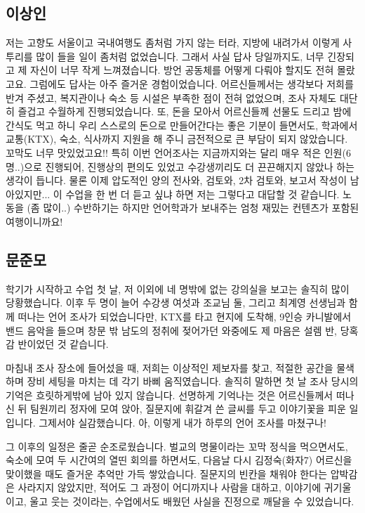 \subsection{이상인}
저는 고향도 서울이고 국내여행도 좀처럼 가지 않는 터라, 지방에 내려가서 이렇게 사투리를 많이 들을 일이 좀처럼 없었습니다. 그래서 사실 답사 당일까지도, 너무 긴장되고 제 자신이 너무 작게 느껴졌습니다. 방언 공동체를 어떻게 다뤄야 할지도 전혀 몰랐고요. 그럼에도 답사는 아주 즐거운 경험이었습니다. 어르신들께서는 생각보다 저희를 반겨 주셨고, 복지관이나 숙소 등 시설은 부족한 점이 전혀 없었으며, 조사 자체도 대단히 즐겁고 수월하게 진행되었습니다. 또, 돈을 모아서 어르신들께 선물도 드리고 밤에 간식도 먹고 하니 우리 스스로의 돈으로 만들어간다는 좋은 기분이 들면서도, 학과에서 교통(KTX), 숙소, 식사까지 지원을 해 주니 금전적으로 큰 부담이 되지 않았습니다. 꼬막도 너무 맛있었고요!! 특히 이번 언어조사는 지금까지와는 달리 매우 적은 인원(6명..)으로 진행되어, 진행상의 편의도 있었고 수강생끼리도 더 끈끈해지지 않았나 하는 생각이 듭니다. 물론 이제 압도적인 양의 전사와, 검토와, 2차 검토와, 보고서 작성이 남아있지만... 이 수업을 한 번 더 듣고 싶냐 하면 저는 그렇다고 대답할 것 같습니다. 노동을 (좀 많이..) 수반하기는 하지만 언어학과가 보내주는 엄청 재밌는 컨텐츠가 포함된 여행이니까요!

\subsection{문준모}
학기가 시작하고 수업 첫 날, 저 이외에 네 명밖에 없는 강의실을 보고는 솔직히 많이 당황했습니다. 이후 두 명이 늘어 수강생 여섯과 조교님 둘, 그리고 최계영 선생님과 함께 떠나는 언어 조사가 되었습니다만, KTX를 타고 현지에 도착해, 9인승 카니발에서 밴드 음악을 들으며 창문 밖 남도의 정취에 젖어가던 와중에도 제 마음은 설렘 반, 당혹감 반이었던 것 같습니다.

마침내 조사 장소에 들어섰을 때, 저희는 이상적인 제보자를 찾고, 적절한 공간을 물색하며 장비 세팅을 마치는 데 각기 바삐 움직였습니다. 솔직히 말하면 첫 날 조사 당시의 기억은 흐릿하게밖에 남아 있지 않습니다. 선명하게 기억나는 것은 어르신들께서 떠나신 뒤 팀원끼리 정자에 모여 앉아, 질문지에 휘갈겨 쓴 글씨를 두고 이야기꽃을 피운 일입니다. 그제서야 실감했습니다. 아, 이렇게 내가 하루의 언어 조사를 마쳤구나!

그 이후의 일정은 줄곧 순조로웠습니다. 벌교의 명물이라는 꼬막 정식을 먹으면서도, 숙소에 모여 두 시간여의 열띤 회의를 하면서도, 다음날 다시 김정숙(화자7) 어르신을 맞이했을 때도 즐거운 추억만 가득 쌓았습니다. 질문지의 빈칸을 채워야 한다는 압박감은 사라지지 않았지만, 적어도 그 과정이 어디까지나 사람을 대하고, 이야기에 귀기울이고, 울고 웃는 것이라는, 수업에서도 배웠던 사실을 진정으로 깨달을 수 있었습니다.

